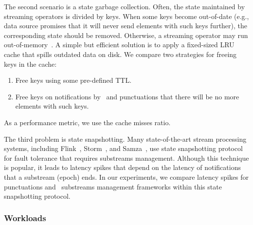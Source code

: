 The second scenario is a state garbage collection. Often, the state maintained by streaming operators is divided by keys. When some keys become out-of-date (e.g., data source promises that it will never send elements with such keys further), the corresponding state should be removed. Otherwise, a streaming operator may run out-of-memory~\cite{Tucker:2003:EPS:776752.776780}. A simple but efficient solution is to apply a fixed-sized LRU cache that spills outdated data on disk. We compare two strategies for freeing keys in the cache:
\begin{enumerate}
    \item Free keys using some pre-defined TTL.
    \item Free keys on notifications by \tracker\ and punctuations that there will be no more elements with such keys.
\end{enumerate}
As a performance metric, we use the cache misses ratio.


The third problem is state snapshotting. Many state-of-the-art stream processing systems, including Flink~\cite{Carbone:2017:SMA:3137765.3137777}, Storm~\cite{Toshniwal:2014:STO:2588555.2595641}, and Samza~\cite{Noghabi:2017:SSS:3137765.3137770}, use state snapshotting protocol~\cite{2015arXiv150608603C} for fault tolerance that requires substreams management. Although this technique is popular, it leads to latency spikes that depend on the latency of notifications that a substream (epoch) ends. In our experiments, we compare latency spikes for punctuations and \tracker\ substreams management frameworks within this state snapshotting protocol.

\subsubsection{Workloads}


